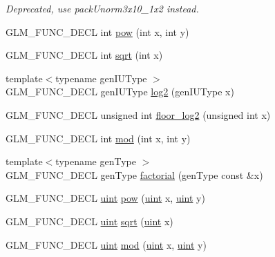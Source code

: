 \begin{DoxyCompactItemize}
\begin{DoxyCompactList}\small\item\em Deprecated, use pack\-Unorm3x10\-\_\-1x2 instead. \end{DoxyCompactList}\item 
G\-L\-M\-\_\-\-F\-U\-N\-C\-\_\-\-D\-E\-C\-L int \hyperlink{group__gtx__integer_ga9642514a44a67afa70966d756f040ca9}{pow} (int x, int y)
\item 
G\-L\-M\-\_\-\-F\-U\-N\-C\-\_\-\-D\-E\-C\-L int \hyperlink{group__gtx__integer_ga78e2e68330e91d350fcfc2f4831cad12}{sqrt} (int x)
\item 
{\footnotesize template$<$typename gen\-I\-U\-Type $>$ }\\G\-L\-M\-\_\-\-F\-U\-N\-C\-\_\-\-D\-E\-C\-L gen\-I\-U\-Type \hyperlink{group__gtx__integer_ga9bd682e74bfacb005c735305207ec417}{log2} (gen\-I\-U\-Type x)
\item 
G\-L\-M\-\_\-\-F\-U\-N\-C\-\_\-\-D\-E\-C\-L unsigned int \hyperlink{group__gtx__integer_ga7011b4e1c1e1ed492149b028feacc00e}{floor\-\_\-log2} (unsigned int x)
\item 
G\-L\-M\-\_\-\-F\-U\-N\-C\-\_\-\-D\-E\-C\-L int \hyperlink{group__gtx__integer_gab9d22df91aac4d9eb925a4910f556f1b}{mod} (int x, int y)
\item 
{\footnotesize template$<$typename gen\-Type $>$ }\\G\-L\-M\-\_\-\-F\-U\-N\-C\-\_\-\-D\-E\-C\-L gen\-Type \hyperlink{group__gtx__integer_ga8cbd3120905f398ec321b5d1836e08fb}{factorial} (gen\-Type const \&x)
\item 
G\-L\-M\-\_\-\-F\-U\-N\-C\-\_\-\-D\-E\-C\-L \hyperlink{group__core__precision_ga4fd29415871152bfb5abd588334147c8}{uint} \hyperlink{group__gtx__integer_gaa8229e850c3cc4ad83492fe390ada044}{pow} (\hyperlink{group__core__precision_ga4fd29415871152bfb5abd588334147c8}{uint} x, \hyperlink{group__core__precision_ga4fd29415871152bfb5abd588334147c8}{uint} y)
\item 
G\-L\-M\-\_\-\-F\-U\-N\-C\-\_\-\-D\-E\-C\-L \hyperlink{group__core__precision_ga4fd29415871152bfb5abd588334147c8}{uint} \hyperlink{group__gtx__integer_ga457e9efca8339bf918d319e9c55f7c8f}{sqrt} (\hyperlink{group__core__precision_ga4fd29415871152bfb5abd588334147c8}{uint} x)
\item 
G\-L\-M\-\_\-\-F\-U\-N\-C\-\_\-\-D\-E\-C\-L \hyperlink{group__core__precision_ga4fd29415871152bfb5abd588334147c8}{uint} \hyperlink{group__gtx__integer_gab8f9ec0ca93ca90669434224818f0750}{mod} (\hyperlink{group__core__precision_ga4fd29415871152bfb5abd588334147c8}{uint} x, \hyperlink{group__core__precision_ga4fd29415871152bfb5abd588334147c8}{uint} y)

\end{DoxyCompactItemize}
